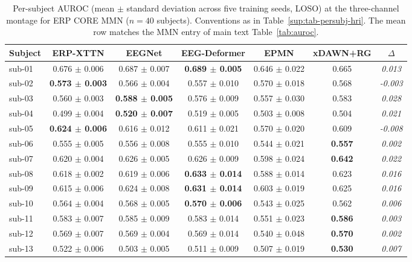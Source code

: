 \begin{table}[t]
\centering
\caption{%
Per-subject AUROC (mean $\pm$ standard deviation across five training seeds, LOSO) at the three-channel montage for ERP CORE MMN ($n = 40$ subjects). Conventions as in Table~\ref{sup:tab-persubj-hri}. The mean row matches the MMN entry of main text Table~\ref{tab:auroc}.%
}
\label{sup:tab-persubj-mmn}
\begin{tabular}{lcccccc}
\toprule
Subject & ERP-XTTN & EEGNet & EEG-Deformer & EPMN & xDAWN+RG & $\Delta$ \\
\midrule
sub-01 & 0.676 $\pm$ 0.006 & 0.687 $\pm$ 0.007 & \textbf{0.689 $\pm$ 0.005} & 0.646 $\pm$ 0.022 & 0.665 & \textit{0.013} \\
sub-02 & \textbf{0.573 $\pm$ 0.003} & 0.566 $\pm$ 0.004 & 0.557 $\pm$ 0.010 & 0.570 $\pm$ 0.018 & 0.568 & \textit{-0.003} \\
sub-03 & 0.560 $\pm$ 0.003 & \textbf{0.588 $\pm$ 0.005} & 0.576 $\pm$ 0.009 & 0.557 $\pm$ 0.030 & 0.583 & \textit{0.028} \\
sub-04 & 0.499 $\pm$ 0.004 & \textbf{0.520 $\pm$ 0.007} & 0.519 $\pm$ 0.005 & 0.503 $\pm$ 0.008 & 0.504 & \textit{0.021} \\
sub-05 & \textbf{0.624 $\pm$ 0.006} & 0.616 $\pm$ 0.012 & 0.611 $\pm$ 0.021 & 0.570 $\pm$ 0.020 & 0.609 & \textit{-0.008} \\
sub-06 & 0.555 $\pm$ 0.005 & 0.556 $\pm$ 0.008 & 0.555 $\pm$ 0.010 & 0.544 $\pm$ 0.021 & \textbf{0.557} & \textit{0.002} \\
sub-07 & 0.620 $\pm$ 0.004 & 0.626 $\pm$ 0.005 & 0.626 $\pm$ 0.009 & 0.598 $\pm$ 0.024 & \textbf{0.642} & \textit{0.022} \\
sub-08 & 0.618 $\pm$ 0.002 & 0.619 $\pm$ 0.006 & \textbf{0.633 $\pm$ 0.014} & 0.588 $\pm$ 0.014 & 0.623 & \textit{0.016} \\
sub-09 & 0.615 $\pm$ 0.006 & 0.624 $\pm$ 0.008 & \textbf{0.631 $\pm$ 0.014} & 0.603 $\pm$ 0.019 & 0.625 & \textit{0.016} \\
sub-10 & 0.564 $\pm$ 0.004 & 0.568 $\pm$ 0.005 & \textbf{0.570 $\pm$ 0.006} & 0.543 $\pm$ 0.025 & 0.562 & \textit{0.006} \\
sub-11 & 0.583 $\pm$ 0.007 & 0.585 $\pm$ 0.009 & 0.583 $\pm$ 0.014 & 0.551 $\pm$ 0.023 & \textbf{0.586} & \textit{0.003} \\
sub-12 & 0.569 $\pm$ 0.007 & 0.569 $\pm$ 0.004 & 0.569 $\pm$ 0.014 & 0.540 $\pm$ 0.048 & \textbf{0.570} & \textit{0.002} \\
sub-13 & 0.522 $\pm$ 0.006 & 0.503 $\pm$ 0.005 & 0.511 $\pm$ 0.009 & 0.507 $\pm$ 0.019 & \textbf{0.530} & \textit{0.007} \\

\end{tabular}
\end{table}
